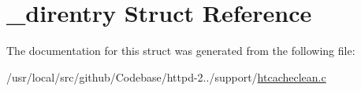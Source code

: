 \hypertarget{struct__direntry}{}\section{\+\_\+direntry Struct Reference}
\label{struct__direntry}


The documentation for this struct was generated from the following file\+:\begin{DoxyCompactItemize}
\item 
/usr/local/src/github/\+Codebase/httpd-\/2../support/\hyperlink{htcacheclean_8c}{htcacheclean.\+c}\end{DoxyCompactItemize}
